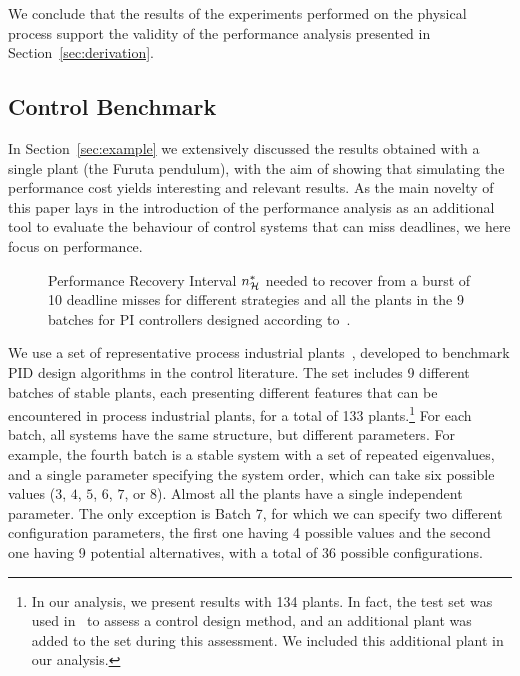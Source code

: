 We conclude that the results of the experiments performed on the physical process support the validity of the performance analysis presented in Section~\ref{sec:derivation}.

\subsection{Control Benchmark}
\label{sec:aggregateresults}

In Section~\ref{sec:example} we extensively discussed the results obtained with a single plant (the Furuta pendulum), with the aim of showing that simulating the performance cost yields interesting and relevant results.
As the main novelty of this paper lays in the introduction of the performance analysis as an additional tool to evaluate the behaviour of control systems that can miss deadlines, we here focus on performance.

\begin{figure}[t]
\centering

\caption{Performance Recovery Interval $n^*_{\mathcal{H}}$ needed to recover from a burst of 10 deadline misses for different strategies and all the plants in the 9 batches for PI controllers designed according to~\cite{Garpinger:2015}.}%
\label{fig:overview10}
\end{figure}
\afterpage{\clearpage}

We use a set of representative process industrial plants~\cite{Astrom:2004}, developed to benchmark PID design algorithms in the control literature.
The set includes 9 different batches of stable plants, each presenting different features that can be encountered in process industrial plants, for a total of 133 plants.\footnote{%
In our analysis, we present results with 134 plants. In fact, the test set was used in~\cite{Garpinger:2015} to assess a control design method, and an additional plant was added to the set during this assessment. We included this additional plant in our analysis.} 
For each batch, all systems have the same structure, but different parameters.
For example, the fourth batch is a stable system with a set of repeated eigenvalues, and a single parameter specifying the system order, which can take six possible values ($3$, $4$, $5$, $6$, $7$, or $8$). 
Almost all the plants have a single independent parameter. 
The only exception is Batch 7, for which we can specify two different configuration parameters, the first one having 4 possible values and the second one having 9 potential alternatives, with a total of 36 possible configurations. 

